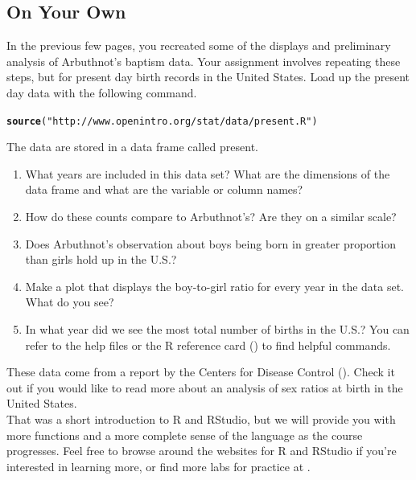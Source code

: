 \documentclass{article}\usepackage[]{graphicx}\usepackage[]{color}
\makeatletter
\newcommand{\hlstr}[1]{\textcolor[rgb]{0.192,0.494,0.8}{#1}}%
\newcommand{\hlstd}[1]{\textcolor[rgb]{0.345,0.345,0.345}{#1}}%
\newcommand{\hlkwd}[1]{\textcolor[rgb]{0.737,0.353,0.396}{\textbf{#1}}}%
\newenvironment{kframe}{%
 \def\at@end@of@kframe{}%
 \ifinner\ifhmode%
  \def\at@end@of@kframe{\end{minipage}}%
  \begin{minipage}{\columnwidth}%
 \fi\fi%
 \def\FrameCommand##1{\hskip\@totalleftmargin \hskip-\fboxsep
 \colorbox{shadecolor}{##1}\hskip-\fboxsep
     \hskip-\linewidth \hskip-\@totalleftmargin \hskip\columnwidth}%
 \MakeFramed {\advance\hsize-\width
   \@totalleftmargin\z@ \linewidth\hsize
   \@setminipage}}%
 {\par\unskip\endMakeFramed%
 \at@end@of@kframe}
\newenvironment{knitrout}{}{} %
\makeatother
\begin{document}
\subsection*{On Your Own}

In the previous few pages, you recreated some of the displays and preliminary analysis of Arbuthnot's baptism data. Your assignment involves repeating these steps, but for present day birth records in the United States.  Load up the present day data with the following command.

\begin{knitrout}
\color{fgcolor}\begin{kframe}
\begin{alltt}
\hlkwd{source}\hlstd{(}\hlstr{"http://www.openintro.org/stat/data/present.R"}\hlstd{)}
\end{alltt}
\end{kframe}
\end{knitrout}

The data are stored in a data frame called \hlstd{present}.

\begin{enumerate}
\item What years are included in this data set? What are the dimensions of the data frame and what are the variable or column names?
\item How do these counts compare to Arbuthnot's? Are they on a similar scale?
\item Does Arbuthnot's observation about boys being born in greater proportion than girls hold up in the U.S.?
\item Make a plot that displays the boy-to-girl ratio for every year in the data set. What do you see?
\item In what year did we see the most total number of births in the U.S.? You can refer to the help files or the R reference card () to find helpful commands. \\
\end{enumerate}

These data come from a report by the Centers for Disease Control (). Check it out if you would like to read more about an analysis of sex ratios at birth in the United States. \\

That was a short introduction to R and RStudio, but we will provide you with more functions and a more complete sense of the language as the course progresses. Feel free to browse around the websites for R  and RStudio  if you're interested in learning more, or find more labs for practice at .
\end{document}
